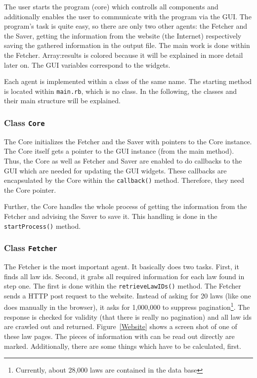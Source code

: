 \documentclass{scrartcl}
\begin{document}
The user starts the program (core) which controlls all components and additionally enables the user to communicate with the program via the GUI. The program's task is quite easy, so there are only two other agents: the Fetcher and the Saver, getting the information from the website (the Internet) respectively saving the gathered information in the output file. The main work is done within the Fetcher. Array:results is colored because it will be explained in more detail later on. The GUI variables correspond to the widgets.

Each agent is implemented within a class of the same name. The starting method is located within \texttt{main.rb}, which is no class. In the following, the classes and their main structure will be explained.



\subsubsection{Class \texttt{Core}}
The Core initializes the Fetcher and the Saver with pointers to the Core instance. The Core itself gets a pointer to the GUI instance (from the main method). Thus, the Core as well as Fetcher and Saver are enabled to do callbacks to the GUI which are needed for updating the GUI widgets. These callbacks are encapsulated by the Core within the \texttt{callback()} method. Therefore, they need the Core pointer.

Further, the Core handles the whole process of getting the information from the Fetcher and advising the Saver to save it. This handling is done in the \texttt{startProcess()} method.



\subsubsection{Class \texttt{Fetcher}}
The Fetcher is the most important agent. It basically does two tasks. First, it finds all law ids. Second, it grabs all required information for each law found in step one. The first is done within the \texttt{retrieveLawIDs()} method. The Fetcher sends a HTTP post request to the website. Instead of asking for 20 laws (like one does manually in the browser), it asks for 1,000,000 to suppress pagination\footnote{Currently, about 28,000 laws are contained in the data base}. The response is checked for validity (that there is really no pagination) and all law ids are crawled out and returned. Figure~\ref{Website} shows a screen shot of one of these law pages. The pieces of information with can be read out directly are marked. Additionally, there are some things which have to be calculated, first.
\end{document}
